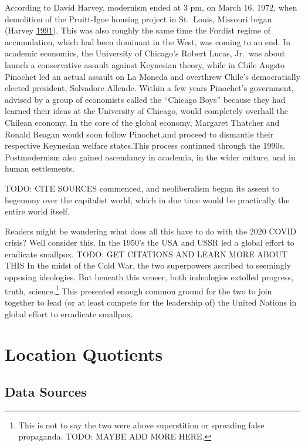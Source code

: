 \documentclass[
  12pt,
]{book}
\begin{document}
According to David Harvey, modernism ended at 3 pm, on March 16, 1972, when demolition of the Pruitt-Igoe housing project in St.~Louis, Missouri began (Harvey \protect\hyperlink{ref-HarveyConditionPostmodernityEnquiry1991}{1991}).
This was also roughly the same time the Fordist regime of accumulation, which had been dominant in the West, was coming to an end. In academic economics, the University of Chicago's Robert Lucas, Jr.~was about launch a conservative assault against Keynesian theory, while in Chile Augsto Pinochet led an actual assault on La Moneda and overthrew Chile's democratially elected president, Salvadore Allende. Within a few years Pinochet's government, advised by a group of economists called the ``Chicago Boys'' because they had learned their ideas at the University of Chicago, would completely overhall the Chilean economy.
In the core of the global economy, Margaret Thatcher and Ronald Reagan would soon follow Pinochet,and proceed to dismantle their respective Keynesian welfare states.This process continued through the 1990s.
Postmodernism also gained ascendancy in academia, in the wider culture, and in human settlements.

TODO: CITE SOURCES
commenced, and neoliberalism began its assent to hegemony over the capitalist world, which in due time would be practically the entire world itself.

Readers might be wondering what does all this have to do with the 2020 COVID crisis? Well consider this. In the 1950's the USA and USSR led a global effort to eradicate smallpox.
TODO: GET CITATIONS AND LEARN MORE ABOUT THIS
In the midst of the Cold War, the two superpowers ascribed to seemingly opposing ideologies. But beneath this veneer, both indeologies extolled progress, truth, science.\footnote{This is not to say the two were above superstition or spreading false propaganda. TODO: MAYBE ADD MORE HERE.}
This presented enough common ground for the two to join together to lead (or at least compete for the leadership of) the United Nations in global effort to erradicate smallpox.

\hypertarget{location-quotients}{%
\chapter{Location Quotients}\label{location-quotients}}

\hypertarget{data-sources}{%
\section{Data Sources}\label{data-sources}}
\end{document}
